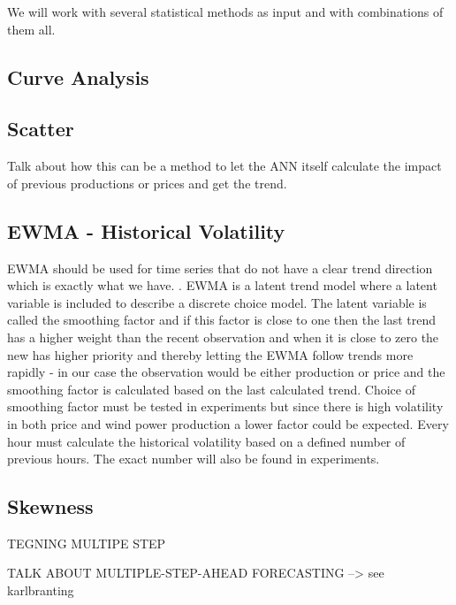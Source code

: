 We will work with several statistical methods as input and with combinations of them all. 

\subsection{Curve Analysis}
\label{sec:curveAnalysis}

\subsection{Scatter}
\label{sec:scatterStrategy}
Talk about how this can be a method to let the ANN itself calculate the impact of previous productions or prices and get the trend.

\subsection{EWMA - Historical Volatility}
\label{sec:ewmaVolatility}

EWMA should be used for time series that do not have a clear trend direction\cite[Chapter~7.3.2]{econometrics} which is exactly what we have. . EWMA is a latent trend model where a latent variable is included to describe a discrete choice model. The latent variable is called the smoothing factor and if this factor is close to one then the last trend has a higher weight than the recent observation and when it is close to zero the new has higher priority and thereby letting the EWMA follow trends more rapidly - in our case the observation would be either production or price and the smoothing factor is calculated based on the last calculated trend. Choice of smoothing factor must be tested in experiments but since there is high volatility in both price and wind power production a lower factor could be expected. Every hour must calculate the historical volatility based on a defined number of previous hours. The exact number will also be found in experiments.

\subsection{Skewness}
\label{sec:skewness}



TEGNING MULTIPE STEP

TALK ABOUT MULTIPLE-STEP-AHEAD FORECASTING --> see karlbranting
